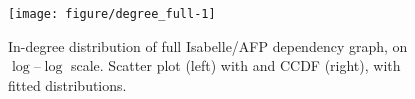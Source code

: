 \begin{knitrout}
\color{fgcolor}\begin{figure}[!htbp]

{\centering \texttt{[image: figure/degree\_full-1]} 

}

\caption[In-degree distribution of full Isabelle/AFP dependency graph, on $\log$--$\log$ scale]{In-degree distribution of full Isabelle/AFP dependency graph, on $\log$--$\log$ scale. Scatter plot (left) with and CCDF (right), with fitted distributions.}\label{fig:degree_full}
\end{figure}

\end{knitrout}
